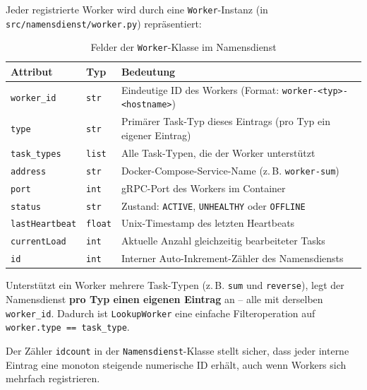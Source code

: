 \noindent Jeder registrierte Worker wird durch eine \texttt{Worker}-Instanz
(in \texttt{src/namensdienst/worker.py}) repräsentiert:

\begin{table}[H]
\centering
\begin{tabular}{m{3.5cm} m{2.4cm} m{7.5cm}}
\toprule
\textbf{Attribut} & \textbf{Typ} & \textbf{Bedeutung} \\
\midrule
\texttt{worker\_id}    & \texttt{str}   & Eindeutige ID des Workers
                                          (Format: \texttt{worker-<typ>-<hostname>}) \\
\texttt{type}          & \texttt{str}   & Primärer Task-Typ dieses Eintrags
                                          (pro Typ ein eigener Eintrag) \\
\texttt{task\_types}   & \texttt{list}  & Alle Task-Typen, die der Worker unterstützt \\
\texttt{address}       & \texttt{str}   & Docker-Compose-Service-Name
                                          (z.\,B. \texttt{worker-sum}) \\
\texttt{port}          & \texttt{int}   & gRPC-Port des Workers im Container \\
\texttt{status}        & \texttt{str}   & Zustand: \texttt{ACTIVE}, \texttt{UNHEALTHY}
                                          oder \texttt{OFFLINE} \\
\texttt{lastHeartbeat} & \texttt{float} & Unix-Timestamp des letzten Heartbeats \\
\texttt{currentLoad}   & \texttt{int}   & Aktuelle Anzahl gleichzeitig bearbeiteter Tasks \\
\texttt{id}            & \texttt{int}   & Interner Auto-Inkrement-Zähler des Namensdiensts \\
\bottomrule
\end{tabular}
\caption{Felder der \texttt{Worker}-Klasse im Namensdienst}
\end{table}

\noindent Unterstützt ein Worker mehrere Task-Typen (z.\,B. \texttt{sum} und
\texttt{reverse}), legt der Namensdienst \textbf{pro Typ einen eigenen Eintrag}
an -- alle mit derselben \texttt{worker\_id}.
Dadurch ist \texttt{LookupWorker} eine einfache Filteroperation
auf \texttt{worker.type == task\_type}.

Der Zähler \texttt{idcount} in der \texttt{Namensdienst}-Klasse
stellt sicher, dass jeder interne Eintrag eine monoton steigende
numerische ID erhält, auch wenn Workers sich mehrfach registrieren.

